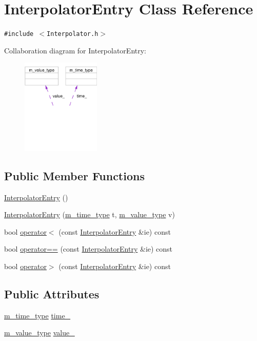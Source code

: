 \hypertarget{classInterpolatorEntry}{
\section{Interpolator\-Entry Class Reference}
\label{classInterpolatorEntry}
}
{\tt \#include $<$Interpolator.h$>$}

Collaboration diagram for Interpolator\-Entry:\begin{figure}[H]
\begin{center}
\leavevmode
\includegraphics[width=106pt]{classInterpolatorEntry__coll__graph}
\end{center}
\end{figure}
\subsection*{Public Member Functions}
\begin{CompactItemize}
\item 
\hyperlink{classInterpolatorEntry_a0}{Interpolator\-Entry} ()
\item 
\hyperlink{classInterpolatorEntry_a1}{Interpolator\-Entry} (\hyperlink{Types_8h_a2}{m\_\-time\_\-type} t, \hyperlink{Types_8h_a3}{m\_\-value\_\-type} v)
\item 
bool \hyperlink{classInterpolatorEntry_a2}{operator$<$} (const  \hyperlink{classInterpolatorEntry}{Interpolator\-Entry} \&ie) const 
\item 
bool \hyperlink{classInterpolatorEntry_a3}{operator==} (const  \hyperlink{classInterpolatorEntry}{Interpolator\-Entry} \&ie) const 
\item 
bool \hyperlink{classInterpolatorEntry_a4}{operator$>$} (const  \hyperlink{classInterpolatorEntry}{Interpolator\-Entry} \&ie) const 
\end{CompactItemize}
\subsection*{Public Attributes}
\begin{CompactItemize}
\item 
\hyperlink{Types_8h_a2}{m\_\-time\_\-type} \hyperlink{classInterpolatorEntry_o0}{time\_\-}
\item 
\hyperlink{Types_8h_a3}{m\_\-value\_\-type} \hyperlink{classInterpolatorEntry_o1}{value\_\-}
\end{CompactItemize}


